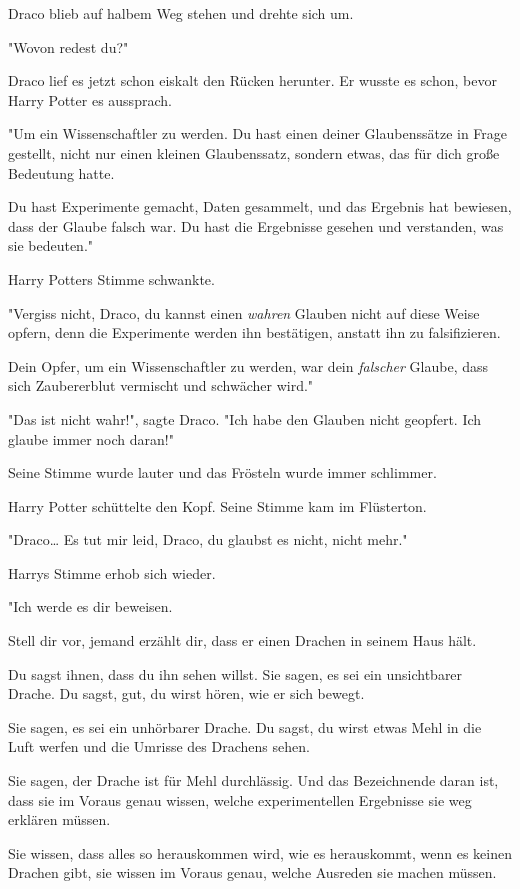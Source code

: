 {Draco blieb auf halbem Weg stehen und drehte sich um.

"Wovon redest du?"

Draco lief es jetzt schon eiskalt den Rücken herunter. Er wusste es schon, bevor Harry Potter es aussprach.

"Um ein Wissenschaftler zu werden. Du hast einen deiner Glaubenssätze in Frage gestellt, nicht nur einen kleinen Glaubenssatz, sondern etwas, das für dich große Bedeutung hatte.

Du hast Experimente gemacht, Daten gesammelt, und das Ergebnis hat bewiesen, dass der Glaube falsch war. Du hast die Ergebnisse gesehen und verstanden, was sie bedeuten."

Harry Potters Stimme schwankte.

"Vergiss nicht, Draco, du kannst einen \emph{wahren} Glauben nicht auf diese Weise opfern, denn die Experimente werden ihn bestätigen, anstatt ihn zu falsifizieren.

Dein Opfer, um ein Wissenschaftler zu werden, war dein \emph{falscher} Glaube, dass sich Zaubererblut vermischt und schwächer wird."

"Das ist nicht wahr!", sagte Draco. "Ich habe den Glauben nicht geopfert. Ich glaube immer noch daran!"

Seine Stimme wurde lauter und das Frösteln wurde immer schlimmer.

Harry Potter schüttelte den Kopf. Seine Stimme kam im Flüsterton.

"Draco… Es tut mir leid, Draco, du glaubst es nicht, nicht mehr."

Harrys Stimme erhob sich wieder.

"Ich werde es dir beweisen.

Stell dir vor, jemand erzählt dir, dass er einen Drachen in seinem Haus hält.

Du sagst ihnen, dass du ihn sehen willst. Sie sagen, es sei ein unsichtbarer Drache. Du sagst, gut, du wirst hören, wie er sich bewegt.

Sie sagen, es sei ein unhörbarer Drache. Du sagst, du wirst etwas Mehl in die Luft werfen und die Umrisse des Drachens sehen.

Sie sagen, der Drache ist für Mehl durchlässig. Und das Bezeichnende daran ist, dass sie im Voraus genau wissen, welche experimentellen Ergebnisse sie weg erklären müssen.

Sie wissen, dass alles so herauskommen wird, wie es herauskommt, wenn es keinen Drachen gibt, sie wissen im Voraus genau, welche Ausreden sie machen müssen.

}
